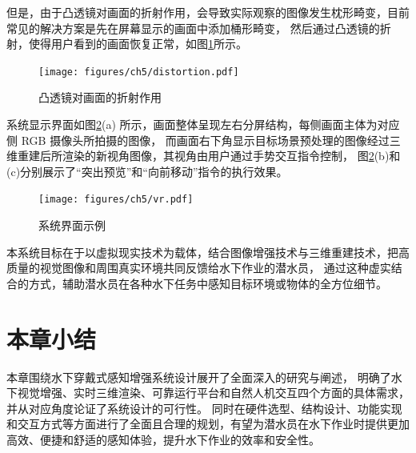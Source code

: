 但是，由于凸透镜对画面的折射作用，会导致实际观察的图像发生枕形畸变，目前常见的解决方案是先在屏幕显示的画面中添加桶形畸变，
然后通过凸透镜的折射，使得用户看到的画面恢复正常，如图\ref{img:distortion}所示。
\begin{figure}[ht]
    \centering
    \texttt{[image: figures/ch5/distortion.pdf]}
    \caption{凸透镜对画面的折射作用}
    \label{img:distortion}
\end{figure}

系统显示界面如图\ref{img:inference}(a) 所示，画面整体呈现左右分屏结构，每侧画面主体为对应侧 RGB 摄像头所拍摄的图像，
而画面右下角显示目标场景预处理的图像经过三维重建后所渲染的新视角图像，其视角由用户通过手势交互指令控制，
图\ref{img:inference}(b)和(c)分别展示了“突出预览”和“向前移动”指令的执行效果。
\begin{figure}
    \centering
    \texttt{[image: figures/ch5/vr.pdf]}
    \caption{系统界面示例}
    \label{img:inference}
\end{figure}

本系统目标在于以虚拟现实技术为载体，结合图像增强技术与三维重建技术，把高质量的视觉图像和周围真实环境共同反馈给水下作业的潜水员，
通过这种虚实结合的方式，辅助潜水员在各种水下任务中感知目标环境或物体的全方位细节。


\section{本章小结}
本章围绕水下穿戴式感知增强系统设计展开了全面深入的研究与阐述，
明确了水下视觉增强、实时三维渲染、可靠运行平台和自然人机交互四个方面的具体需求，并从对应角度论证了系统设计的可行性。
同时在硬件选型、结构设计、功能实现和交互方式等方面进行了全面且合理的规划，有望为潜水员在水下作业时提供更加高效、便捷和舒适的感知体验，提升水下作业的效率和安全性。













